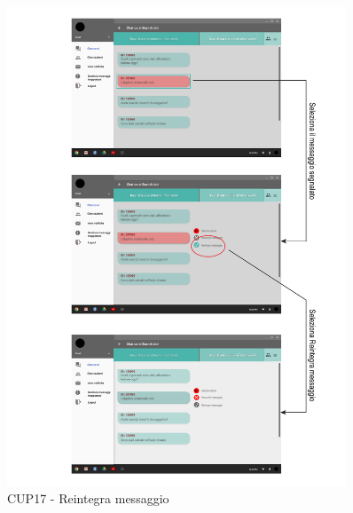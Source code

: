 \begin{figure}
	\centering
	\includegraphics[width=0.9\textwidth]{imgs/gruppo6/activities/act_cup17_reintegra_messaggio.pdf}
	\caption{CUP17  - Reintegra messaggio}
	\label{fig:cup17}
\end{figure}

